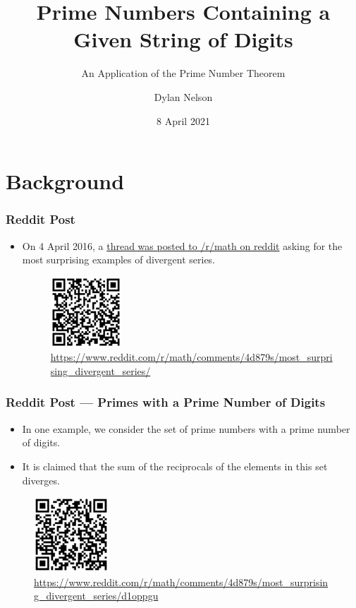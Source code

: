 \documentclass{beamer}
\title[Prime Strings]{Prime Numbers Containing a Given String of Digits}
\subtitle{An Application of the Prime Number Theorem}
\author{Dylan Nelson}
\institute[SUMS]{Stellenbosch University Mathematics Society}
\date{8 April 2021}
\begin{document}
\frame{\titlepage}

\section{Background}

\begin{frame}
    \frametitle{Reddit Post}

    \begin{itemize}
        \item On 4 April 2016, a \href{https://www.reddit.com/r/math/comments/4d879s/most_surprising_divergent_series/}{thread was posted to /r/math on reddit} asking for the most surprising examples of divergent series.
        \begin{figure}
            \centering
            \includegraphics[width=0.25\textwidth]{reddit_thread.png}
            \caption{\url{https://www.reddit.com/r/math/comments/4d879s/most_surprising_divergent_series/}}
        \end{figure}
    \end{itemize}

\end{frame}

\begin{frame}
    \frametitle{Reddit Post — Primes with a Prime Number of Digits}

    \begin{itemize}
        \item In one example, we consider the set of prime numbers with a prime number of digits. \pause
        \item It is claimed that the sum of the reciprocals of the elements in this set diverges.
    \end{itemize} 

    \begin{figure}
        \centering
        \includegraphics[width=0.25\textwidth]{reddit_prime_number_of_digits.png}
        \caption{\url{https://www.reddit.com/r/math/comments/4d879s/most_surprising_divergent_series/d1oppgu}}
    \end{figure}

\end{frame}
\end{document}
